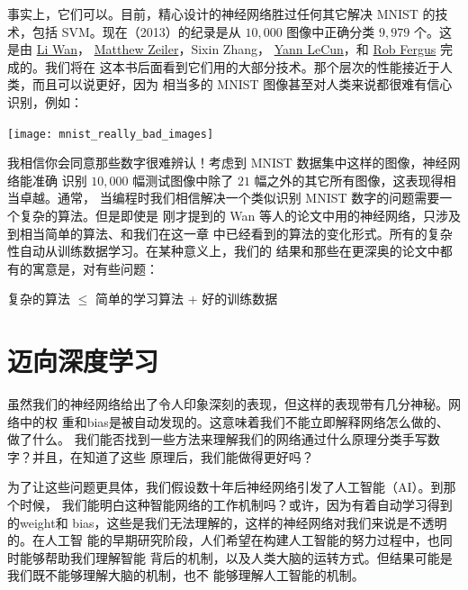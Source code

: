 事实上，它们可以。目前，精心设计的神经网络胜过任何其它解决 MNIST 的技术，包括
SVM。现在（2013）的纪录是从 $10,000$ 图像中正确分类 $9,979$ 个。这是由
\href{http://www.cs.nyu.edu/~wanli/}{Li Wan}，
\href{http://www.matthewzeiler.com/}{Matthew Zeiler}，Sixin Zhang，
\href{http://yann.lecun.com/}{Yann LeCun}，和
\href{http://cs.nyu.edu/~fergus/pmwiki/pmwiki.php}{Rob Fergus} 完成的。我们将在
这本书后面看到它们用的大部分技术。那个层次的性能接近于人类，而且可以说更好，因为
相当多的 MNIST 图像甚至对人类来说都很难有信心识别，例如：
\begin{center}
  \texttt{[image: mnist\_really\_bad\_images]}
\end{center}

我相信你会同意那些数字很难辨认！考虑到 MNIST 数据集中这样的图像，神经网络能准确
识别 $10,000$ 幅测试图像中除了 $21$ 幅之外的其它所有图像，这表现得相当卓越。通常，
当编程时我们相信解决一个类似识别 MNIST 数字的问题需要一个复杂的算法。但是即使是
刚才提到的 Wan 等人的论文中用的神经网络，只涉及到相当简单的算法、和我们在这一章
中已经看到的算法的变化形式。所有的复杂性自动从训练数据学习。在某种意义上，我们的
结果和那些在更深奥的论文中都有的寓意是，对有些问题：

\begin{center}
  复杂的算法 $\leq$ 简单的学习算法 + 好的训练数据
\end{center}

\section{迈向深度学习}
\label{sec:toward_deep_learning}

虽然我们的神经网络给出了令人印象深刻的表现，但这样的表现带有几分神秘。网络中的权
重和\gls*{bias}是被自动发现的。这意味着我们不能立即解释网络怎么做的、做了什么。
我们能否找到一些方法来理解我们的网络通过什么原理分类手写数字？并且，在知道了这些
原理后，我们能做得更好吗？

为了让这些问题更具体，我们假设数十年后神经网络引发了人工智能（AI）。到那个时候，
我们能明白这种智能网络的工作机制吗？或许，因为有着自动学习得到的\gls*{weight}和%
\gls*{bias}，这些是我们无法理解的，这样的神经网络对我们来说是不透明的。在人工智
能的早期研究阶段，人们希望在构建人工智能的努力过程中，也同时能够帮助我们理解智能
背后的机制，以及人类大脑的运转方式。但结果可能是我们既不能够理解大脑的机制，也不
能够理解人工智能的机制。

